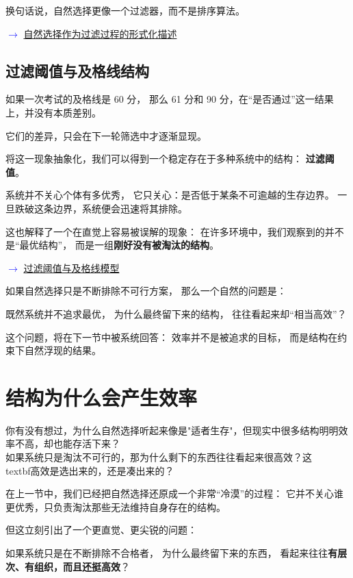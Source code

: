 \documentclass[openany, a4paper, 12pt]{book}
\newcommand{\mathlink}[2]{%
	\par\noindent
	\textcolor{blue}{\small$\rightarrow$ \hyperref[#1]{#2}}
	\par
}
\newcommand{\lowfreq}[1]{\textbf{\textcolor{red!70!black}{#1}}}
\newenvironment{motivation}{
	\vspace{0.5em}
	\begin{tcolorbox}[
		colback=gray!10,           %
		colframe=gray!60,          %
		title=\textit{本章动机 (Motivation)},
		fonttitle=\bfseries,
		arc=0mm,                   %
		leftrule=3mm               %
		]
		\small \itshape %
	}{
	\end{tcolorbox}
	\vspace{1em}
}
\begin{document}
换句话说，自然选择更像一个过滤器，而不是排序算法。

\mathlink{math:selection_filter}{自然选择作为过滤过程的形式化描述}

\subsection{过滤阈值与及格线结构}

\begin{readingnote}
	如果一次考试的及格线是 60 分，
	那么 61 分和 90 分，在“是否通过”这一结果上，并没有本质差别。
	
	它们的差异，只会在下一轮筛选中才逐渐显现。
\end{readingnote}

将这一现象抽象化，我们可以得到一个稳定存在于多种系统中的结构：
\lowfreq{过滤阈值}。

系统并不关心个体有多优秀，
它只关心：是否低于某条不可逾越的生存边界。
一旦跌破这条边界，系统便会迅速将其排除。


这也解释了一个在直觉上容易被误解的现象：
在许多环境中，我们观察到的并不是“最优结构”，
而是一组\lowfreq{刚好没有被淘汰的结构}。

\mathlink{math:threshold_model}{过滤阈值与及格线模型}

\begin{readingnote}
	如果自然选择只是不断排除不可行方案，
	那么一个自然的问题是：
	
	既然系统并不追求最优，
	为什么最终留下来的结构，
	往往看起来却“相当高效”？
\end{readingnote}

这个问题，将在下一节中被系统回答：
效率并不是被追求的目标，
而是结构在约束下自然浮现的结果。


\section{结构为什么会产生效率}

\begin{readingnote}
	你有没有想过，为什么自然选择听起来像是"适者生存"，但现实中很多结构明明效率不高，却也能存活下来？\\
	如果系统只是淘汰不可行的，那为什么剩下的东西往往看起来很高效？这\\textbf{高效是选出来的，还是凑出来的}？
\end{readingnote}

\begin{motivation}
	在上一节中，我们已经把自然选择还原成一个非常“冷漠”的过程：
	它并不关心谁更优秀，只负责淘汰那些无法维持自身存在的结构。
	
	但这立刻引出了一个更直觉、更尖锐的问题：
	
	如果系统只是在不断排除不合格者，
	为什么最终留下来的东西，
	看起来往往\lowfreq{有层次、有组织，而且还挺高效}？
\end{motivation}
\end{document}
